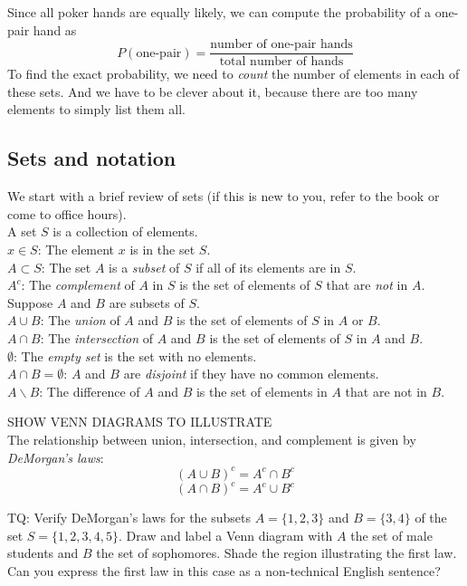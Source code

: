 \documentclass[12pt]{article}
\begin{document}
Since all poker hands are equally likely, we can compute the probability of a one-pair hand as
$$P(\text{one-pair}) = \frac{\text{number of one-pair hands}}{\text{total number of hands}}$$
To find the exact probability, we need to {\em count} the number of elements in each of these sets.  And we have to be clever about it, because there are too many elements to simply list them all.

\subsection{Sets and notation}
We start with a brief review of sets (if this is new to you, refer to the book or come to office hours). \\

A set $S$ is a collection of elements. \\
$x \in S$: The element $x$ is in the set $S$.\\
$A \subset S$: The set $A$ is a {\em subset} of $S$ if all of its elements are in $S$. \\
$A^c$: The {\em complement} of $A$ in $S$ is the set of elements of $S$ that are {\em not} in $A$. \\

Suppose $A$ and $B$ are subsets of $S$. \\
$A \cup B$: The {\em union} of $A$ and $B$ is the set of elements of $S$ in $A$ or $B$. \\
$A \cap B$: The {\em intersection} of $A$ and $B$ is the set of elements of $S$ in $A$ and $B$. \\
$\emptyset$: The {\em empty set} is the set with no elements. \\
$A \cap B = \emptyset$: $A$ and $B$ are {\em disjoint} if they have no common elements. \\
$A \backslash B$: The difference of $A$ and $B$ is the set of elements in $A$ that are not in $B$.

SHOW VENN DIAGRAMS TO ILLUSTRATE\\

The relationship between union, intersection, and complement is given by {\em DeMorgan's laws}:
$$(A \cup B)^c = A^c \cap B^c$$
$$(A \cap B)^c = A^c \cup B^c$$

TQ:  Verify DeMorgan's laws for the subsets $A = \{1,2,3\}$ and $B = \{3,4\}$ of the set $S = \{1,2,3,4,5\}$.  Draw and label a Venn diagram with $A$ the set of male students and $B$ the set of sophomores.  Shade the region illustrating the first law.  Can you express the first law in this case as a non-technical English sentence?\\
\end{document}
